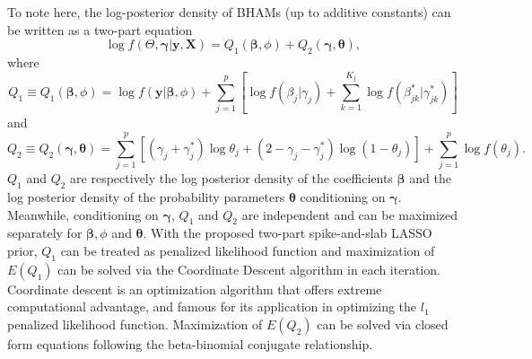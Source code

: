 \documentclass[AMA,STIX1COL,]{WileyNJD-v2}
\begin{document}
To note here, the log-posterior density of BHAMs (up to additive
constants) can be written as a two-part equation
\[ \log f(\Theta, \boldsymbol{\gamma}| \textbf{y}, \textbf{X}) = Q_1(\boldsymbol{\beta}, \phi) + Q_2 (\boldsymbol{\gamma},\boldsymbol{\theta}),\]
where
\[ Q_1\equiv Q_1(\boldsymbol{\beta}, \phi) = \log f(\textbf{y}|\boldsymbol{\beta}, \phi) + \sum\limits_{j=1}^p\left[\log f(\beta_j|\gamma_j)+\sum\limits_{k=1}^{K_j} \log f(\beta^{*}_{jk}|\gamma^{*}_{jk})\right]\]
and
\[Q_2 \equiv Q_2(\boldsymbol{\gamma},\boldsymbol{\theta}) = \sum\limits_{j=1}^{p} \left[ (\gamma_j+\gamma_{j}^{*})\log \theta_j + (2-\gamma_j-\gamma_{j}^{*}) \log (1-\theta_j)\right] +  \sum\limits_{j=1}^{p}\log f(\theta_j).\]
\(Q_1\) and \(Q_2\) are respectively the log posterior density of the
coefficients \(\boldsymbol{\beta}\) and the log posterior density of the
probability parameters \(\boldsymbol{\theta}\) conditioning on
\(\boldsymbol{\gamma}\). Meanwhile, conditioning on
\(\boldsymbol{\gamma}\), \(Q_1\) and \(Q_2\) are independent and can be
maximized separately for \(\boldsymbol{\beta}, \phi\) and
\(\boldsymbol{\theta}\). With the proposed two-part spike-and-slab LASSO
prior, \(Q_1\) can be treated as penalized likelihood function and
maximization of \(E(Q_1)\) can be solved via the Coordinate Descent
algorithm in each iteration. Coordinate descent is an optimization
algorithm that offers extreme computational advantage, and famous for
its application in optimizing the \(l_1\) penalized likelihood function.
Maximization of \(E(Q_2)\) can be solved via closed form equations
following the beta-binomial conjugate relationship.
\end{document}
